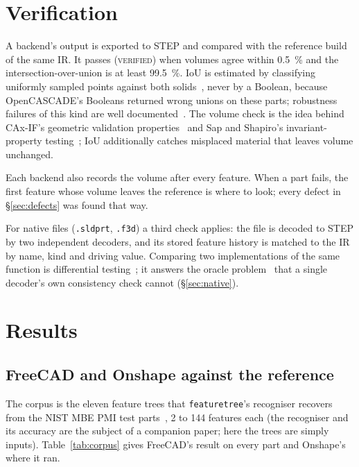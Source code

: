 \documentclass[11pt]{article}
\newcommand{\code}[1]{\texttt{\small #1}}
\newcommand{\VERIFIED}{\textsc{verified}}
\begin{document}
\section{Verification}\label{sec:verify}

A backend's output is exported to STEP and compared with the reference build of
the same IR. It passes (\VERIFIED{}) when volumes agree within
\SI{0.5}{\percent} and the intersection-over-union is at least
\SI{99.5}{\percent}. IoU is estimated by classifying uniformly sampled points
against both solids~\cite{tilove1980smc}, never by a Boolean, because
OpenCASCADE's Booleans returned wrong unions on these parts; robustness failures
of this kind are well documented~\cite{kettner2008robustness,zhou2016mesharr}.
The volume check is the idea behind CAx-IF's geometric validation
properties~\cite{caxif_gvp_2014} and Sap and Shapiro's invariant-property
testing~\cite{sap2019invariant}; IoU additionally catches misplaced material
that leaves volume unchanged.

Each backend also records the volume after every feature. When a part fails,
the first feature whose volume leaves the reference is where to look; every
defect in \S\ref{sec:defects} was found that way.

For native files (\code{.sldprt}, \code{.f3d}) a third check applies:
the file is decoded to STEP by two independent decoders, and its stored feature
history is matched to the IR by name, kind and driving value. Comparing two
implementations of the same function is differential
testing~\cite{mckeeman1998differential,yang2011csmith}; it answers the oracle
problem~\cite{barr2015oracle} that a single decoder's own consistency check
cannot (\S\ref{sec:native}).

\section{Results}\label{sec:results}

\subsection{FreeCAD and Onshape against the reference}

The corpus is the eleven feature trees that \code{featuretree}'s recogniser
recovers from the NIST MBE PMI test parts~\cite{lipman2017nistpmi}, 2 to 144
features each (the recogniser and its accuracy are the subject of a companion
paper; here the trees are simply inputs). Table~\ref{tab:corpus} gives
FreeCAD's result on every part and Onshape's where it ran.
\end{document}
